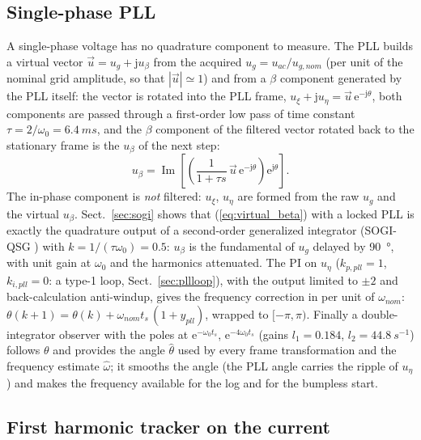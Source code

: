 \documentclass[10pt,a4paper]{scrartcl}
\newcommand{\ts}{t_s}
\newcommand{\wo}{\omega_0}
\newcommand{\jj}{\mathrm{j}}
\newcommand{\ee}{\mathrm{e}}
\renewcommand{\Im}{\operatorname{Im}}
\begin{document}
\begin{onehalfspace}
\subsection{Single-phase PLL}
\label{sec:pllstructure}

A single-phase voltage has no quadrature component to measure. The PLL builds a virtual vector $\vec u = u_g + \jj u_\beta$ from the acquired $u_g = u_{ac}/u_{g,nom}$ (per unit of the nominal grid amplitude, so that $|\vec u| \simeq 1$) and from a $\beta$ component generated by the PLL itself: the vector is rotated into the PLL frame, $u_\xi + \jj u_\eta = \vec u\,\ee^{-\jj\theta}$, both components are passed through a first-order low pass of time constant $\tau = 2/\wo = \SI{6.4}{ms}$, and the $\beta$ component of the filtered vector rotated back to the stationary frame is the $u_\beta$ of the next step:
\begin{equation}
u_\beta = \Im\!\left[\left(\frac{1}{1 + \tau s}\,\vec u\,\ee^{-\jj\theta}\right)\ee^{\jj\theta}\right].
\label{eq:virtual_beta}
\end{equation}
The in-phase component is \emph{not} filtered: $u_\xi$, $u_\eta$ are formed from the raw $u_g$ and the virtual $u_\beta$. Sect.~\ref{sec:sogi} shows that (\ref{eq:virtual_beta}) with a locked PLL is exactly the quadrature output of a second-order generalized integrator (SOGI-QSG \cite{ciobotaru2006}) with $k = 1/(\tau\wo) = 0.5$: $u_\beta$ is the fundamental of $u_g$ delayed by \SI{90}{\degree}, with unit gain at $\wo$ and the harmonics attenuated. The PI on $u_\eta$ ($k_{p,pll} = 1$, $k_{i,pll} = 0$: a type-1 loop, Sect.~\ref{sec:pllloop}), with the output limited to $\pm 2$ and back-calculation anti-windup, gives the frequency correction in per unit of $\omega_{nom}$: $\theta(k+1) = \theta(k) + \omega_{nom}\ts\,(1 + y_{pll})$, wrapped to $[-\pi, \pi)$. Finally a double-integrator observer with the poles at $\ee^{-\wo\ts}$, $\ee^{-4\wo\ts}$ (gains $l_1 = 0.184$, $l_2 = \SI{44.8}{s^{-1}}$) follows $\theta$ and provides the angle $\hat\theta$ used by every frame transformation and the frequency estimate $\hat\omega$; it smooths the angle (the PLL angle carries the ripple of $u_\eta$) and makes the frequency available for the log and for the bumpless start.

\subsection{First harmonic tracker on the current}
\label{sec:fhtstructure}


\end{onehalfspace}
\end{document}
